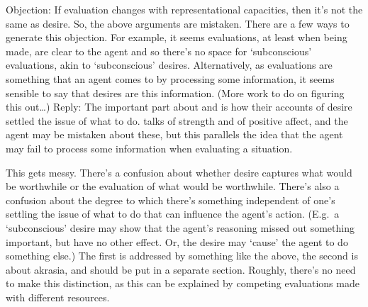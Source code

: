 \documentclass[10pt]{article}
\begin{document}
Objection: If evaluation changes with representational capacities, then it's not the same as desire.
So, the above arguments are mistaken.
There are a few ways to generate this objection.
For example, it seems evaluations, at least when being made, are clear to the agent and so there's no space for `subconscious' evaluations, akin to `subconscious' desires.
Alternatively, as evaluations are something that an agent comes to by processing some information, it seems sensible to say that desires are this information.
(More work to do on figuring this out\dots)
Reply: The important part about \citeauthor{Sinhababu:2017aa} and \citeauthor{Railton:2012aa} is how their accounts of desire settled the issue of what to do.
\citeauthor{Sinhababu:2017aa} talks of strength and \citeauthor{Railton:2012aa} of positive affect, and the agent may be mistaken about these, but this parallels the idea that the agent may fail to process some information when evaluating a situation.

This gets messy.
There's a confusion about whether desire captures what would be worthwhile or the evaluation of what would be worthwhile.
There's also a confusion about the degree to which there's something independent of one's settling the issue of what to do that can influence the agent's action.
(E.g.\ a `subconscious' desire may show that the agent's reasoning missed out something important, but have no other effect. Or, the desire may `cause' the agent to do something else.)
The first is addressed by something like the above, the second is about akrasia, and should be put in a separate section.
Roughly, there's no need to make this distinction, as this can be explained by competing evaluations made with different resources.






\end{document}
